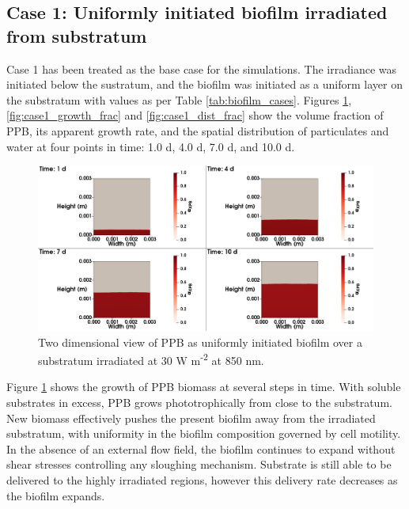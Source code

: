 \subsection{Case 1: Uniformly initiated biofilm irradiated from substratum}
Case 1 has been treated as the base case for the simulations. The irradiance was initiated below the sustratum, and the biofilm was initiated as a uniform layer on the substratum with values as per Table \ref{tab:biofilm_cases}. Figures \ref{fig:case1_ppb_frac}, \ref{fig:case1_growth_frac} and \ref{fig:case1_dist_frac} show the volume fraction of PPB, its apparent growth rate, and the spatial distribution of particulates and water at four points in time: 1.0 d, 4.0 d, 7.0 d, and 10.0 d. 
\begin{figure}[H]
    \centering
     \hspace*{-1cm}\includegraphics[width=1.1\textwidth,height=0.4\textheight]{Chap4/methods/data/figures/case1_ppb_frac.png}
    \caption{Two dimensional view of PPB as uniformly initiated biofilm over a substratum irradiated at 30 W m\textsuperscript{-2} at 850 nm.} 
    \label{fig:case1_ppb_frac}
\end{figure}

Figure \ref{fig:case1_ppb_frac} shows the growth of PPB biomass at several steps in time. With soluble substrates in excess, PPB grows phototrophically from close to the substratum. New biomass effectively pushes the present biofilm away from the irradiated substratum, with uniformity in the biofilm composition governed by cell motility. In the absence of an external flow field, the biofilm continues to expand without shear stresses controlling any sloughing mechanism. Substrate is still able to be delivered to the highly irradiated regions, however this delivery rate decreases as the biofilm expands. 

